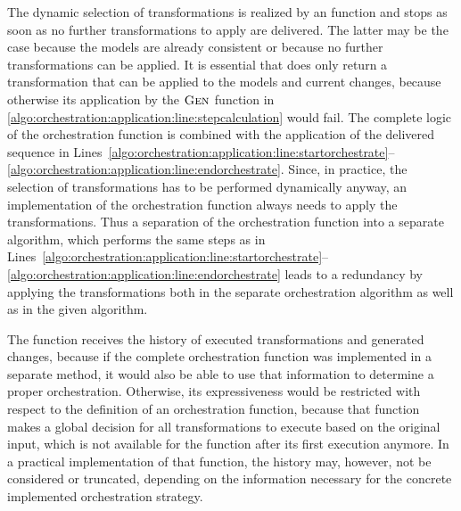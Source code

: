 The dynamic selection of transformations is realized by an  function and stops as soon as no further transformations to apply are delivered.
The latter may be the case because the models are already consistent or because no further transformations can be applied.
It is essential that  does only return a transformation that can be applied to the models and current changes, because otherwise its application by the $\textsc{Gen}_{}$ function in \autoref{algo:orchestration:application:line:stepcalculation} would fail.
The complete logic of the orchestration function is combined with the application of the delivered sequence in Lines~\ref{algo:orchestration:application:line:startorchestrate}--\ref{algo:orchestration:application:line:endorchestrate}.
Since, in practice, the selection of transformations has to be performed dynamically anyway, an implementation of the orchestration function always needs to apply the transformations.
Thus a separation of the orchestration function into a separate algorithm, which performs the same steps as in Lines~\ref{algo:orchestration:application:line:startorchestrate}--\ref{algo:orchestration:application:line:endorchestrate} leads to a redundancy by applying the transformations both in the separate orchestration algorithm as well as in the given algorithm.

The  function receives the history of executed transformations and generated changes, because if the complete orchestration function was implemented in a separate method, it would also be able to use that information to determine a proper orchestration.
Otherwise, its expressiveness would be restricted with respect to the definition of an orchestration function, because that function makes a global decision for all transformations to execute based on the original input, which is not available for the  function after its first execution anymore.
In a practical implementation of that function, the history may, however, not be considered or truncated, depending on the information necessary for the concrete implemented orchestration strategy.

